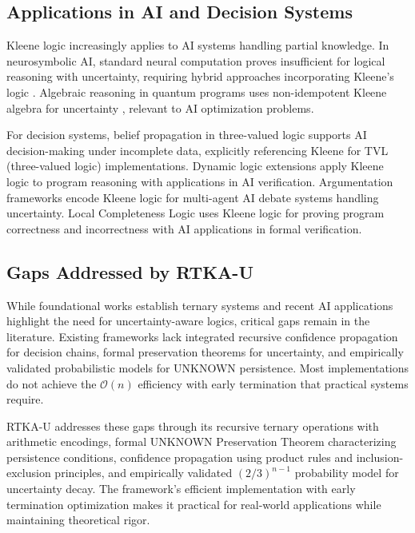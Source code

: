\documentclass[11pt,a4paper]{article}
\begin{document}
\subsection{Applications in AI and Decision Systems}

Kleene logic increasingly applies to AI systems handling partial knowledge. In neurosymbolic AI, standard neural computation proves insufficient for logical reasoning with uncertainty, requiring hybrid approaches incorporating Kleene's logic \cite{neurosymbolic2025}. Algebraic reasoning in quantum programs uses non-idempotent Kleene algebra for uncertainty \cite{quantum2021}, relevant to AI optimization problems.

For decision systems, belief propagation in three-valued logic \cite{belief2022} supports AI decision-making under incomplete data, explicitly referencing Kleene for TVL (three-valued logic) implementations. Dynamic logic extensions \cite{dynamic2024} apply Kleene logic to program reasoning with applications in AI verification. Argumentation frameworks \cite{argumentation2025} encode Kleene logic for multi-agent AI debate systems handling uncertainty. Local Completeness Logic \cite{local2022} uses Kleene logic for proving program correctness and incorrectness with AI applications in formal verification.

\subsection{Gaps Addressed by RTKA-U}

While foundational works establish ternary systems and recent AI applications highlight the need for uncertainty-aware logics, critical gaps remain in the literature. Existing frameworks lack integrated recursive confidence propagation for decision chains, formal preservation theorems for uncertainty, and empirically validated probabilistic models for UNKNOWN persistence. Most implementations do not achieve the $\mathcal{O}(n)$ efficiency with early termination that practical systems require.

RTKA-U addresses these gaps through its recursive ternary operations with arithmetic encodings, formal UNKNOWN Preservation Theorem characterizing persistence conditions, confidence propagation using product rules and inclusion-exclusion principles, and empirically validated $(2/3)^{n-1}$ probability model for uncertainty decay. The framework's efficient implementation with early termination optimization makes it practical for real-world applications while maintaining theoretical rigor.
\end{document}
